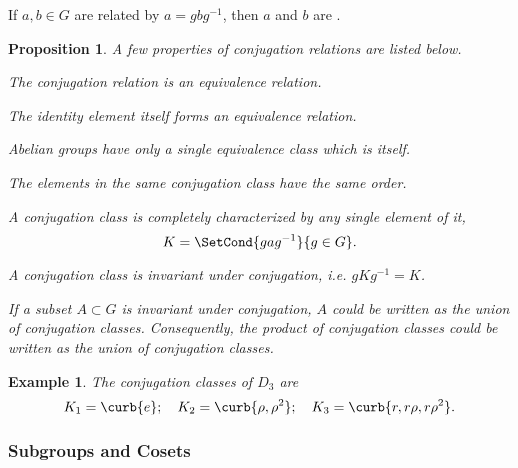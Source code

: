 \documentclass[hidelinks]{article}
\newtheorem{example}{Example}
\newtheorem{proposition}{Proposition}
\begin{document}
If $a,b\in G$ are related by $a = gbg^{-1}$, then $a$ and $b$ are .
\begin{proposition}
    A few properties of conjugation relations are listed below.
    \begin{cenum}
        \item The conjugation relation is an equivalence relation.
        \item The identity element itself forms an equivalence relation.
        \item Abelian groups have only a single equivalence class which is itself.
        \item The elements in the same conjugation class have the same order.
        \item A conjugation class is completely characterized by any single element of it,
        \[ K = \SetCond{gag^{-1}}{g\in G}. \]
        \item A conjugation class is invariant under conjugation, i.e. $gKg^{-1} = K$.
        \item If a subset $A\subset G$ is invariant under conjugation, $A$ could be written as the union of conjugation classes. Consequently, the product of conjugation classes could be written as the union of conjugation classes.
    \end{cenum}
\end{proposition}
\begin{sample}
    \begin{example}
        The conjugation classes of $D_3$ are
        \[ K_1 = \curb{e};\quad K_2 = \curb{\rho,\rho^2};\quad K_3 = \curb{r,r\rho,r\rho^2}. \]
    \end{example}
\end{sample}


\subsubsection{Subgroups and Cosets} %
\label{ssub:subgroups_and_cosets}
\end{document}
